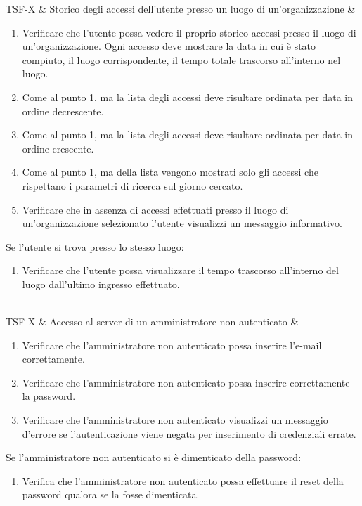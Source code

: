 TSF-X & Storico degli accessi dell'utente presso un luogo di un'organizzazione & \begin{enumerate}
    \item Verificare che l'utente possa vedere il proprio storico accessi presso il luogo di un'organizzazione. Ogni accesso deve mostrare la data in cui è stato compiuto, il luogo corrispondente, il tempo totale trascorso all'interno nel luogo.
    \item Come al punto 1, ma la lista degli accessi deve risultare ordinata per data in ordine decrescente.
    \item Come al punto 1, ma la lista degli accessi deve risultare ordinata per data in ordine crescente.
    \item Come al punto 1, ma della lista vengono mostrati solo gli accessi che rispettano i parametri di ricerca sul giorno cercato.
    \item Verificare che in assenza di accessi effettuati presso il luogo di un'organizzazione selezionato l'utente visualizzi un messaggio informativo.
\end{enumerate}
Se l'utente si trova presso lo stesso luogo:
\begin{enumerate}
    \item Verificare che l'utente possa visualizzare il tempo trascorso all'interno del luogo dall'ultimo ingresso effettuato.
\end{enumerate} \\

TSF-X & Accesso al server di un amministratore non autenticato & \begin{enumerate}
    \item Verificare che l'amministratore non autenticato possa inserire l'e-mail correttamente.
    \item Verificare che l'amministratore non autenticato possa inserire correttamente la password.
    \item Verificare che l'amministratore non autenticato visualizzi un messaggio d'errore se l'autenticazione viene negata per inserimento di credenziali errate.
\end{enumerate}
Se l'amministratore non autenticato si è dimenticato della password:
\begin{enumerate}
    \item Verifica che l'amministratore non autenticato possa effettuare il reset della password qualora se la fosse dimenticata.
\end{enumerate} \\

